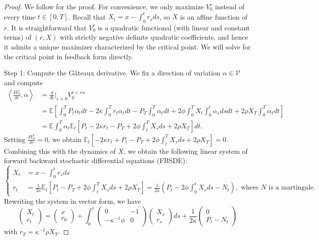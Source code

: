 \documentclass[openany,oneside]{article}
\theoremstyle{definition}
\theoremstyle{remark}
\newcommand{\E}{\mathbb{E}} %
\newcommand{\ts}{\textstyle}
\begin{document}
\begin{proof}
We follow \cite{bouchard2017equilibrium} for the proof. For convenience, we only maximize $V^r_0$ instead of every time $t\in[0,T]$. Recall that $X_t = x-\int_0^t r_s ds$, so $X$ is an affine function of $r$. It is straightforward that $V^r_0$ is a quadratic functional (with linear and constant terms) of $(r,X)$ with strictly negative definite quadratic coefficients, and hence it admits a unique maximizer characterized by the critical point. We will solve for the critical point in feedback form directly.

Step 1: Compute the G\^ateaux derivative. We fix a direction of variation $\alpha \in \mathcal{V}$ and compute
\begin{align*}
\ts\left\langle \frac{\delta V^r_0}{\delta r}, \alpha \right\rangle &\ts= \frac{d}{d\epsilon}\Big\vert_{\epsilon=0} V^{r+\epsilon\alpha}_0  \\
&\ts= \E\left[\int_0^T P_t \alpha_t dt - 2\kappa\int_0^T r_t \alpha_t dt - P_T \int_0^T \alpha_t dt + 2\phi\int_0^T X_t \int_0^t \alpha_s ds dt + 2\rho X_T \int_0^T \alpha_t dt \right] \\
&\ts= \E\int_0^T \alpha_t \E_t\left[P_t - 2\kappa r_t - P_T + 2\phi\int_t^T X_s ds + 2\rho X_T \right] dt.
\end{align*}
Setting $\frac{\delta V^r_0}{\delta r}=0$, we obtain $\E_t[-2\kappa r_t + P_t - P_T + 2\phi\int_t^T X_s ds + 2\rho X_T ] = 0$. Combining this with the dynamics of $X$, we obtain the following linear system of forward backward stochastic differential equations (FBSDE):
\[
\begin{cases}
X_t &= x-\int_0^t r_s ds \\
r_t &= \frac{1}{2\kappa}\E_t\left[P_t-P_T+2\phi\int_t^T X_s ds + 2\rho X_T\right] = \frac{1}{2\kappa}\left(P_t-2\phi\int_0^t X_s ds - N_t\right), \textrm{ where $N$ is a martingale.} 
\end{cases}
\]
Rewriting the system in vector form, we have
\[
\begin{pmatrix} X_t \\ r_t \end{pmatrix} = \begin{pmatrix} x \\ r_0 \end{pmatrix} + \int_0^t \begin{pmatrix} 0 & -1 \\ -\kappa^{-1}\phi & 0 \end{pmatrix} \begin{pmatrix} X_s \\ r_s \end{pmatrix} ds + \frac{1}{2\kappa}\begin{pmatrix} 0 \\ P_t - N_t \end{pmatrix}
\]
with $r_T = \kappa^{-1}\rho X_T$.


\end{proof}
\end{document}
